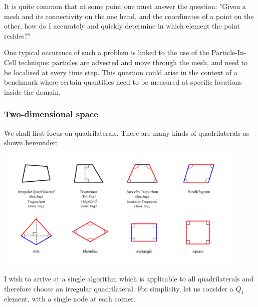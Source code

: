 
It is quite common that at some point one must answer the question:
"Given a mesh and its connectivity on the one hand, and the coordinates of a 
point on the other, how do I accurately and quickly determine in which element 
the point resides?"

One typical occurence of such a problem is linked to the use of the Particle-In-Cell 
technique: particles are advected and move through the mesh, and need to be localised 
at every time step. This question could arise in the context of a benchmark where 
certain quantities need to be measured at specific locations inside the domain. 

\subsubsection{Two-dimensional space}

We shall first focus on quadrilaterals. There are many kinds of quadrilaterals as shown 
hereunder: 

\begin{center}
\includegraphics[width=12cm]{images/quadrilaterals} %
\end{center}

I wish to arrive at a single algorithm which is applicable to all quadrilaterals and therefore 
choose an irregular quadrilateral. For simplicity, let us consider a $Q_1$ element, with a single
node at each corner. 

\begin{center}
\\
\end{center}

